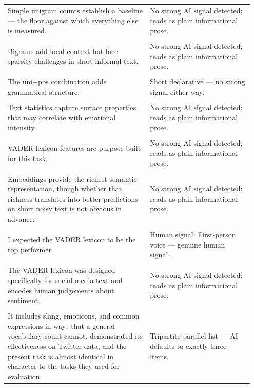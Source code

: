 \documentclass[11pt]{article}
\begin{document}
\begin{longtable}{|p{0.55\linewidth}|p{0.40\linewidth}|}
\hline
\rule{0pt}{3.5cm} & \\
\hline
Simple unigram counts establish a baseline --- the floor against which everything else is measured. & No strong AI signal detected; reads as plain informational prose. \\[2pt]
\hline
\rule{0pt}{3.5cm} & \\
\hline
Bigrams add local context but face sparsity challenges in short informal text. & No strong AI signal detected; reads as plain informational prose. \\[2pt]
\hline
\rule{0pt}{3.5cm} & \\
\hline
The uni+pos combination adds grammatical structure. & Short declarative --- no strong signal either way. \\[2pt]
\hline
\rule{0pt}{3.5cm} & \\
\hline
Text statistics capture surface properties that may correlate with emotional intensity. & No strong AI signal detected; reads as plain informational prose. \\[2pt]
\hline
\rule{0pt}{3.5cm} & \\
\hline
VADER lexicon features are purpose-built for this task. & No strong AI signal detected; reads as plain informational prose. \\[2pt]
\hline
\rule{0pt}{3.5cm} & \\
\hline
Embeddings provide the richest semantic representation, though whether that richness translates into better predictions on short noisy text is not obvious in advance. & No strong AI signal detected; reads as plain informational prose. \\[2pt]
\hline
\rule{0pt}{3.5cm} & \\
\hline
I expected the VADER lexicon to be the top performer. & Human signal: First-person voice --- genuine human signal. \\[2pt]
\hline
\rule{0pt}{3.5cm} & \\
\hline
The VADER lexicon was designed specifically for social media text and encodes human judgements about sentiment. & No strong AI signal detected; reads as plain informational prose. \\[2pt]
\hline
\rule{0pt}{3.5cm} & \\
\hline
It includes slang, emoticons, and common expressions in ways that a general vocabulary count cannot. demonstrated its effectiveness on Twitter data, and the present task is almost identical in character to the tasks they used for evaluation. & Tripartite parallel list --- AI defaults to exactly three items. \\[2pt]

\end{longtable}
\end{document}
